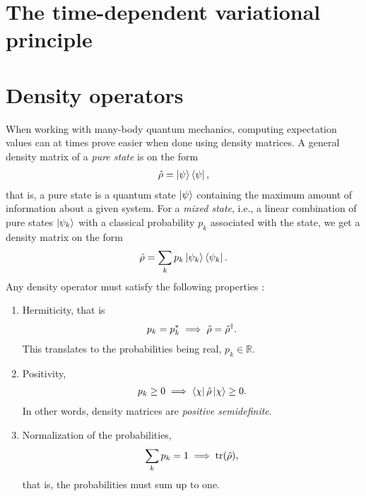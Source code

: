     \section{The time-dependent variational principle}


    \section{Density operators}
        When working with many-body quantum mechanics, computing expectation
        values can at times prove easier when done using density matrices. A
        general density matrix of a \emph{pure state} is on the form
        \begin{align}
            \hat{\rho} = \ket{\psi}\bra{\psi},
        \end{align}
        that is, a pure state is a quantum state $\ket{\psi}$ containing the
        maximum amount of information about a given system. For a \emph{mixed
        state}, i.e., a linear combination of pure states $\ket{\psi_k}$ with a
        classical probability $p_k$ associated with the state, we get a density
        matrix on the form
        \begin{align}
            \hat{\rho} = \sum_{k} p_k \ket{\psi_k}\bra{\psi_k}.
        \end{align}
        Any density operator must satisfy the following
        properties \cite{modern-qm}:
        \begin{enumerate}
            \item Hermiticity, that is
                \begin{align}
                    p_k = p_k^{*} \implies \hat{\rho} = \hat{\rho}^{\dagger}.
                \end{align}
                This translates to the probabilities being real, $p_k \in
                \mathbb{R}$.
            \item Positivity,
                \begin{align}
                    p_k \geq 0 \implies \bra{\chi}\hat{\rho}\ket{\chi} \geq 0.
                \end{align}
                In other words, density matrices are \emph{positive
                semidefinite}.
            \item Normalization of the probabilities,
                \begin{align}
                    \sum_{k} p_k = 1 \implies \tr(\hat{\rho}),
                \end{align}
                that is, the probabilities must sum up to one.
        \end{enumerate}
